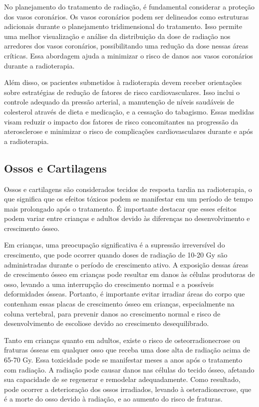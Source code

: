 \documentclass[11pt,a4paper]{article}
\begin{document}
	No planejamento do tratamento de radiação, é fundamental considerar a proteção dos vasos coronários. Os vasos coronários podem ser delineados como estruturas adicionais durante o planejamento tridimensional do tratamento. Isso permite uma melhor visualização e análise da distribuição da dose de radiação nos arredores dos vasos coronários, possibilitando uma redução da dose nessas áreas críticas. Essa abordagem ajuda a minimizar o risco de danos aos vasos coronários durante a radioterapia.

	Além disso, os pacientes submetidos à radioterapia devem receber orientações sobre estratégias de redução de fatores de risco cardiovasculares. Isso inclui o controle adequado da pressão arterial, a manutenção de níveis saudáveis de colesterol através de dieta e medicação, e a cessação do tabagismo. Essas medidas visam reduzir o impacto dos fatores de risco concomitantes na progressão da aterosclerose e minimizar o risco de complicações cardiovasculares durante e após a radioterapia.

\subsection*{Ossos e Cartilagens}


	Ossos e cartilagens são considerados tecidos de resposta tardia na radioterapia, o que significa que os efeitos tóxicos podem se manifestar em um período de tempo mais prolongado após o tratamento. É importante destacar que esses efeitos podem variar entre crianças e adultos devido às diferenças no desenvolvimento e crescimento ósseo.

	Em crianças, uma preocupação significativa é a supressão irreversível do crescimento, que pode ocorrer quando doses de radiação de 10-20 Gy são administradas durante o período de crescimento ativo. A exposição dessas áreas de crescimento ósseo em crianças pode resultar em danos às células produtoras de osso, levando a uma interrupção do crescimento normal e a possíveis deformidades ósseas. Portanto, é importante evitar irradiar áreas do corpo que contenham essas placas de crescimento ósseo em crianças, especialmente na coluna vertebral, para prevenir danos ao crescimento normal e risco de desenvolvimento de escoliose devido ao crescimento desequilibrado.

	Tanto em crianças quanto em adultos, existe o risco de osteorradionecrose ou fraturas ósseas em qualquer osso que receba uma dose alta de radiação acima de 65-70 Gy. Essa toxicidade pode se manifestar meses a anos após o tratamento com radiação. A radiação pode causar danos nas células do tecido ósseo, afetando sua capacidade de se regenerar e remodelar adequadamente. Como resultado, pode ocorrer a deterioração dos ossos irradiados, levando à osteradionecrose, que é a morte do osso devido à radiação, e ao aumento do risco de fraturas.
\end{document}
